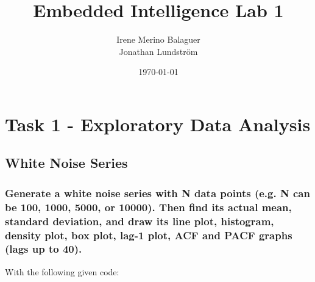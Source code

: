 \documentclass{article}
\title{Embedded Intelligence Lab 1}
\author{Irene Merino Balaguer\\Jonathan Lundström }
\date{\today}
\begin{document}
\maketitle

\section{Task 1 - Exploratory Data Analysis}

\subsection {White Noise Series}
\subsubsection{ Generate a white noise series with N data points (e.g. N can be 100, 1000, 5000,
 or 10000). Then find its actual mean, standard deviation, and draw its line plot,
 histogram, density plot, box plot, lag-1 plot, ACF and PACF graphs (lags up to
 40).}
 With the following given code:
 
\end{document}
